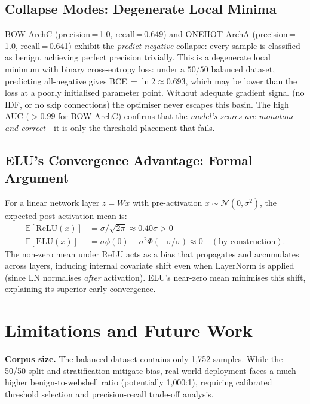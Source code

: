 \documentclass[10pt,conference,letterpaper]{IEEEtran}
\newcommand{\E}{\mathbb{E}}
\begin{document}
\subsection{Collapse Modes: Degenerate Local Minima}

BOW-ArchC (precision\,=\,1.0, recall\,=\,0.649) and ONEHOT-ArchA
(precision\,=\,1.0, recall\,=\,0.641) exhibit the \emph{predict-negative}
collapse: every sample is classified as benign, achieving perfect precision
trivially. This is a degenerate local minimum with binary cross-entropy loss:
under a $50/50$ balanced dataset, predicting all-negative gives
BCE\,$=\ln 2\approx0.693$, which may be lower than the loss at a poorly
initialised parameter point. Without adequate gradient signal (no IDF, or no
skip connections) the optimiser never escapes this basin. The high AUC
($>0.99$ for BOW-ArchC) confirms that the \emph{model's scores are monotone
and correct}---it is only the threshold placement that fails.

\subsection{ELU's Convergence Advantage: Formal Argument}

For a linear network layer $z=Wx$ with pre-activation $x\sim\mathcal{N}(0,\sigma^2)$,
the expected post-activation mean is:
\begin{align*}
  \E[\mathrm{ReLU}(x)] &= \sigma/\sqrt{2\pi}\approx 0.40\sigma > 0 \\
  \E[\mathrm{ELU}(x)]  &= \sigma\phi(0)-\sigma^2\Phi(-\sigma/\sigma)
    \approx 0\quad(\text{by construction}).
\end{align*}
The non-zero mean under ReLU acts as a bias that propagates and accumulates
across layers, inducing internal covariate shift even when LayerNorm is applied
(since LN normalises \emph{after} activation). ELU's near-zero mean minimises
this shift, explaining its superior early convergence.

\section{Limitations and Future Work}
\label{sec:limit}

\textbf{Corpus size.} The balanced dataset contains only 1{,}752 samples.
While the 50/50 split and stratification mitigate bias, real-world deployment
faces a much higher benign-to-webshell ratio (potentially 1{,}000:1), requiring
calibrated threshold selection and precision-recall trade-off analysis.
\end{document}
